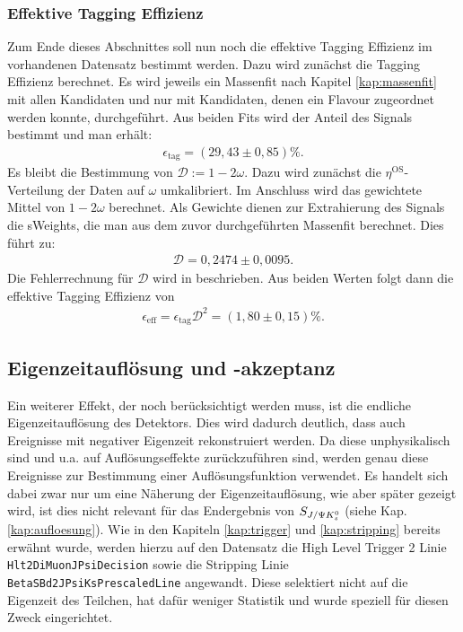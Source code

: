 \subsubsection{Effektive Tagging Effizienz}
Zum Ende dieses Abschnittes soll nun noch die effektive Tagging Effizienz im vorhandenen Datensatz bestimmt werden. Dazu wird zunächst die Tagging Effizienz berechnet. Es wird jeweils ein Massenfit nach Kapitel \ref{kap:massenfit} mit allen Kandidaten und nur mit Kandidaten, denen ein Flavour zugeordnet werden konnte, durchgeführt. Aus beiden Fits wird der Anteil des Signals bestimmt und man erhält:
\begin{align}
\epsilon_{\text{tag}} = (29,43\pm 0,85)\%.
\end{align}
Es bleibt die Bestimmung von $\mathcal{D}:=1-2\omega$. Dazu wird zunächst die $\eta^{\text{OS}}$-Verteilung der Daten auf $\omega$ umkalibriert. Im Anschluss wird das gewichtete Mittel von $1-2\omega$ berechnet. Als Gewichte dienen zur Extrahierung des Signals die sWeights, die man aus dem zuvor durchgeführten Massenfit berechnet. Dies führt zu:
\begin{align}
\mathcal{D} = 0,2474\pm 0,0095.
\end{align}
Die Fehlerrechnung für $\mathcal{D}$ wird in \cite{2010-analyse} beschrieben. Aus beiden Werten folgt dann die effektive Tagging Effizienz von
\begin{align}
\epsilon_{\text{eff}} = \epsilon_{\text{tag}} \mathcal{D}^2 = (1,80\pm 0,15)\%.
\end{align}

\subsection{Eigenzeitauflösung und -akzeptanz}
Ein weiterer Effekt, der noch berücksichtigt werden muss, ist die endliche Ei\-gen\-zeit\-auf\-lösung des Detektors. Dies wird dadurch deutlich, dass auch Ereignisse mit negativer Eigenzeit rekonstruiert werden. Da diese unphysikalisch sind und u.a. auf Auflösungseffekte zurückzuführen sind, werden genau diese Ereignisse zur Bestimmung einer Auflösungsfunktion verwendet. Es handelt sich dabei zwar nur um eine Näherung der Eigenzeitauflösung, wie aber später gezeigt wird, ist dies nicht relevant für das Endergebnis von $S_{J/\Psi K_s^0}$ (siehe Kap. \ref{kap:aufloesung}). Wie in den Kapiteln \ref{kap:trigger} und \ref{kap:stripping} bereits erwähnt wurde, werden hierzu auf den Datensatz die High Level Trigger 2 Linie \texttt{Hlt2DiMuonJPsiDecision} sowie die Stripping Linie \texttt{BetaSBd2JPsiKsPrescaledLine} angewandt. Diese selektiert nicht auf die Eigenzeit des Teilchen, hat dafür weniger Statistik und wurde speziell für diesen Zweck eingerichtet.

